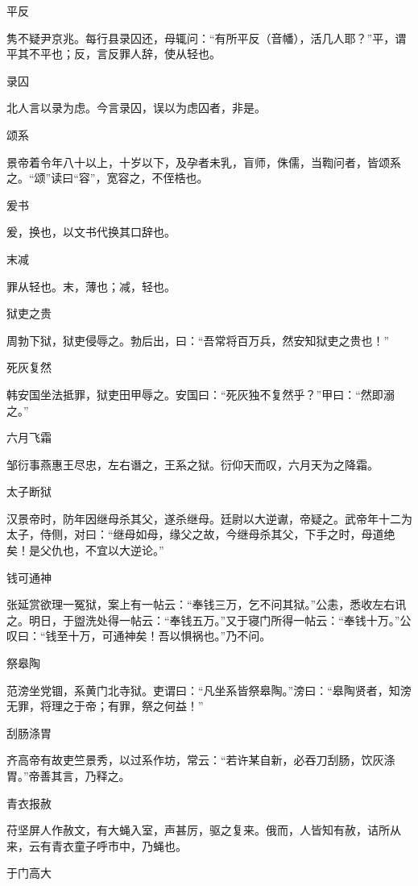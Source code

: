 \documentclass[a4paper,12pt,UTF8,twoside]{ctexbook}
\begin{document}
    平反
    
    隽不疑尹京兆。每行县录囚还，母辄问：“有所平反（音幡），活几人耶？”平，谓平其不平也；反，言反罪人辞，使从轻也。
    
    录囚
    
    北人言以录为虑。今言录囚，误以为虑囚者，非是。
    
    颂系
    
    景帝着令年八十以上，十岁以下，及孕者未乳，盲师，侏儒，当鞫问者，皆颂系之。“颂”读曰“容”，宽容之，不侄梏也。
    
    爰书
    
    爰，换也，以文书代换其口辞也。
    
    末减
    
    罪从轻也。末，薄也；减，轻也。
    
    狱吏之贵
    
    周勃下狱，狱吏侵辱之。勃后出，曰：“吾常将百万兵，然安知狱吏之贵也！”
    
    死灰复然
    
    韩安国坐法抵罪，狱吏田甲辱之。安国曰：“死灰独不复然乎？”甲曰：“然即溺之。”
    
    六月飞霜
    
    邹衍事燕惠王尽忠，左右谮之，王系之狱。衍仰天而叹，六月天为之降霜。
    
    太子断狱
    
    汉景帝时，防年因继母杀其父，遂杀继母。廷尉以大逆谳，帝疑之。武帝年十二为太子，侍侧，对曰：“继母如母，缘父之故，今继母杀其父，下手之时，母道绝矣！是父仇也，不宜以大逆论。”
    
    钱可通神
    
    张延赏欲理一冤狱，案上有一帖云：“奉钱三万，乞不问其狱。”公恚，悉收左右讯之。明日，于盥洗处得一帖云：“奉钱五万。”又于寝门所得一帖云：“奉钱十万。”公叹曰：“钱至十万，可通神矣！吾以惧祸也。”乃不问。
    
    祭皋陶
    
    范滂坐党锢，系黄门北寺狱。吏谓曰：“凡坐系皆祭皋陶。”滂曰：“皋陶贤者，知滂无罪，将理之于帝；有罪，祭之何益！”
    
    刮肠涤胃
    
    齐高帝有故吏竺景秀，以过系作坊，常云：“若许某自新，必吞刀刮肠，饮灰涤胃。”帝善其言，乃释之。
    
    青衣报赦
    
    苻坚屏人作赦文，有大蝇入室，声甚厉，驱之复来。俄而，人皆知有赦，诘所从来，云有青衣童子呼市中，乃蝇也。
    
    于门高大
    
\end{document}
